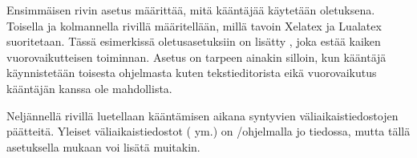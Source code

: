 Ensimmäisen rivin asetus määrittää, mitä kääntäjää käytetään oletuksena.
Toisella ja kolmannella rivillä määritellään, millä tavoin Xelatex ja
Lualatex suoritetaan. Tässä esimerkissä oletus\-asetuksiin on lisätty
, joka estää kaiken vuorovaikutteisen toiminnan.
Asetus on tarpeen ainakin silloin, kun kääntäjä käynnistetään toisesta
ohjelmasta kuten teks\-ti\-edi\-to\-ris\-ta eikä vuorovaikutus kääntäjän
kanssa ole mahdollista.

Neljännellä rivillä luetellaan kääntämisen aikana syntyvien
väli\-aikais\-tiedostojen päätteitä. Yleiset väli\-aikais\-tiedostot
( ym.) on \-/ohjelmalla jo tiedossa,
mutta tällä asetuksella mukaan voi lisätä muitakin.
